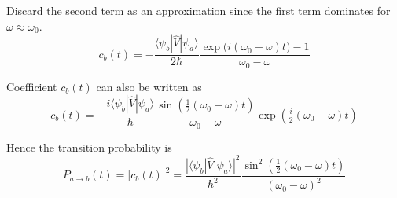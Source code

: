 Discard the second term as an approximation since the first
term dominates for $\omega\approx\omega_0$.
\begin{equation*}
c_b(t)=-\frac{\langle\psi_b|\hat V|\psi_a\rangle}{2\hbar}
\frac{\exp\bigl(i(\omega_0-\omega)t\bigr)-1}{\omega_0-\omega}
\end{equation*}

Coefficient $c_b(t)$ can also be written as
\begin{equation*}
c_b(t)=-\frac{i\langle\psi_b|\hat V|\psi_a\rangle}{\hbar}
\frac{\sin\left(\tfrac{1}{2}(\omega_0-\omega)t\right)}{\omega_0-\omega}
\exp\left(\tfrac{i}{2}(\omega_0-\omega)t\right)
\tag{3}
\end{equation*}

Hence the transition probability is
\begin{equation*}
P_{a\rightarrow b}(t)=|c_b(t)|^2
=\frac{|\langle\psi_b|\hat V|\psi_a\rangle|^2}{\hbar^2}
\frac{\sin^2\left(\tfrac{1}{2}(\omega_0-\omega)t\right)}
{(\omega_0-\omega)^2}
\tag{4}
\end{equation*}


